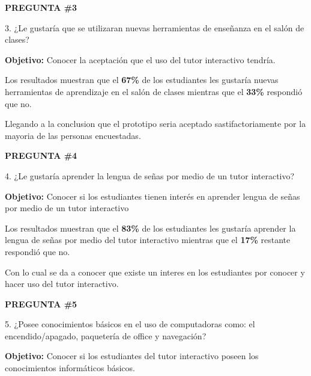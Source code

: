 \documentclass[12pt]{report}%
\begin{document}
\newpage
\textbf{PREGUNTA \#3}

3. ¿Le gustaría que se utilizaran nuevas herramientas de enseñanza en el salón de clases?

\textbf{Objetivo:} Conocer la aceptación que el uso del tutor interactivo tendría.

\begin{center}
\end{center}


Los resultados muestran que el \textbf{67\%} de los estudiantes les gustaría nuevas herramientas de aprendizaje en el salón de clases mientras que el \textbf{33\%} respondió que no.

Llegando a la conclusion que el prototipo seria aceptado sastifactoriamente por la mayoria de las personas encuestadas. 

\newpage
\textbf{PREGUNTA \#4}

4. ¿Le gustaría aprender la lengua de señas por medio de un tutor interactivo?

\textbf{Objetivo:} Conocer si los estudiantes tienen interés en aprender lengua de señas por medio de un tutor interactivo

\begin{center}
\end{center}


Los resultados muestran que el \textbf{83\%} de los estudiantes les gustaría aprender la lengua de señas por medio del tutor interactivo mientras que el \textbf{17\%} restante respondió que no.

Con lo cual se da a conocer que existe un interes en los estudiantes por conocer y hacer uso del tutor interactivo.


\newpage
\textbf{PREGUNTA \#5}

5. ¿Posee conocimientos básicos en el uso de computadoras como: el encendido/apagado, paquetería de office y navegación?

\textbf{Objetivo:} Conocer si los estudiantes del tutor interactivo poseen los conocimientos informáticos básicos.
\end{document}
